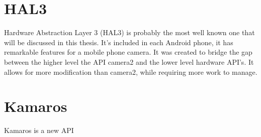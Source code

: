 \section{HAL3}
Hardware Abstraction Layer 3 (HAL3) is probably the most well known one that
will be discussed in this thesis. It's included in each Android phone, it has
remarkable features for a mobile phone camera. It was created to bridge the gap
between the higher level the API camera2 and the lower level hardware API's. It
allows for more modification than camera2, while requiring more work to manage.

\section{Kamaros}
Kamaros is a new API

